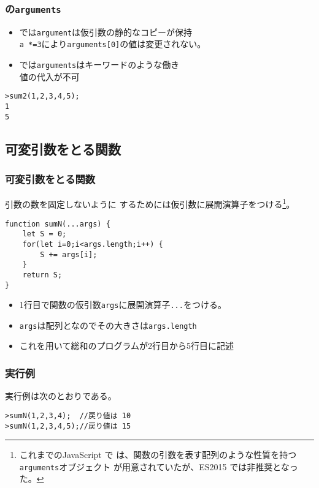 \begin{frame}[containsverbatim]
\frametitle{\Strict の\Verb+arguments+}
\begin{itemize}
 \item \Strict では\Verb+argument+は仮引数の静的なコピーが保持\\
       \Verb+a *=3+により\Verb+arguments[0]+の値は変更されない。
 \item \Strict では\Verb+arguments+はキーワードのような働き\\
       値の代入が不可
\end{itemize} 

\begin{Verbatim}
>sum2(1,2,3,4,5);
1
5
\end{Verbatim}
\end{frame}
\else
\subsection{可変引数をとる関数}
\begin{frame}[containsverbatim]
\frametitle{可変引数をとる関数}
引数の数を固定しないように
するためには仮引数に展開演算子をつける\footnote{これまでのJavaScript で
は、関数の引数を表す配列のような性質を持つ\texttt{arguments}オブジェクト
 が用意されていたが、ES2015 では非推奨となった。}。
 
\begin{Verbatim}
function sumN(...args) {
    let S = 0;
    for(let i=0;i<args.length;i++) {
        S += args[i];
    }
    return S;
}
\end{Verbatim}
\begin{itemize}
 \item 1行目で関数の仮引数\texttt{args}に展開演算子\texttt{...}をつける。
 \item \texttt{args}は配列となのでその大きさは\texttt{args.length}
 \item これを用いて総和のプログラムが2行目から5行目に記述
\end{itemize}
\end{frame}
\begin{frame}[containsverbatim]
\frametitle{実行例}
実行例は次のとおりである。
\begin{Verbatim}
>sumN(1,2,3,4);  //戻り値は 10
>sumN(1,2,3,4,5);//戻り値は 15
\end{Verbatim}
\end{frame}
\fi
